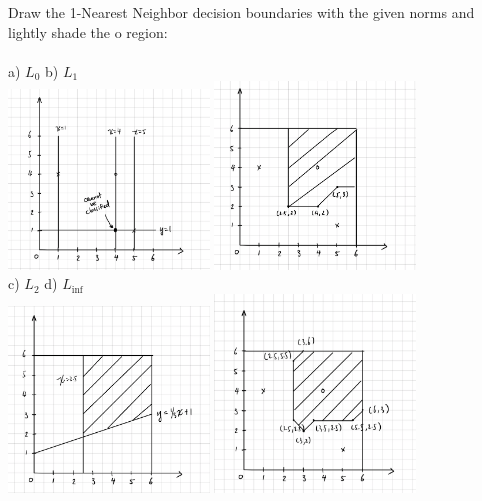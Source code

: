 \documentclass[english]{article}
\begin{document}
\begin{enumerate}
Draw the 1-Nearest Neighbor decision boundaries with the given norms and lightly shade the o region: \\ \\ a) $L_0$ \qquad \qquad \qquad \qquad \qquad \qquad \qquad \qquad b) $L_1$\\ 
\includegraphics[width=0.4\textwidth]{images/L0.png}
\includegraphics[width=0.4\textwidth]{images/L1.png} \\
c) $L_2$ \qquad \qquad \qquad \qquad \qquad \qquad \qquad \qquad d) $L_{\inf}$\\
\includegraphics[width=0.4\textwidth]{images/L2.png}
\includegraphics[width=0.4\textwidth]{images/Linf.png} \\

\end{enumerate}
\end{document}
